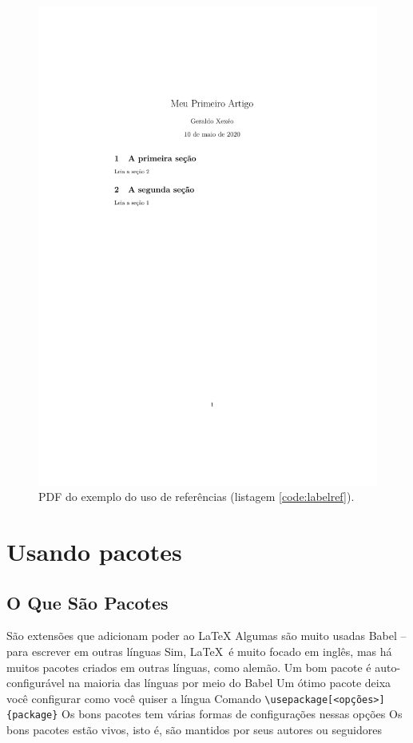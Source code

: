 \begin{figure}
    \centering
    \includegraphics[height=.4\textheight,frame,
    clip,trim= 4.5cm  11cm 4cm 5cm]{labelref}
    \caption{PDF do exemplo do uso de referências (listagem \ref{code:labelref}).}
    \label{fig:labelref}
\end{figure}

\section{Usando pacotes}

\subsection{O Que São Pacotes}
    \begin{outline}
        \1 São extensões que adicionam poder ao \LaTeX
        \1 Algumas são muito usadas
        \2 Babel -- para escrever em outras línguas
        \3 Sim, \LaTeX\ é muito focado em inglês, mas há muitos pacotes criados em outras línguas, como alemão.
        \3 Um bom pacote é auto-configurável na maioria das línguas por meio do Babel
        \3 Um ótimo pacote deixa você configurar como você quiser a língua
        \1 Comando 
        \2 \lstinline|\usepackage[<opções>]{package}|
        \1 Os bons pacotes tem várias formas de configurações nessas opções
        \1 Os bons pacotes estão vivos, isto é, são mantidos por seus autores ou seguidores
    \end{outline}


